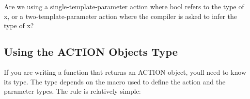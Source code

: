 \begin{DoxyCode}{0}
\end{DoxyCode}


Are we using a single-\/template-\/parameter action where {\ttfamily bool} refers to the type of {\ttfamily x}, or a two-\/template-\/parameter action where the compiler is asked to infer the type of {\ttfamily x}?

\subsection*{Using the A\+C\+T\+I\+ON Object\textquotesingle{}s Type}

If you are writing a function that returns an {\ttfamily A\+C\+T\+I\+ON} object, you\textquotesingle{}ll need to know its type. The type depends on the macro used to define the action and the parameter types. The rule is relatively simple\+: \tabulinesep=1mm

